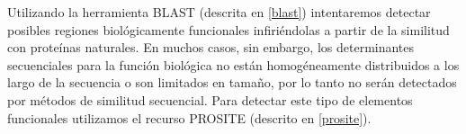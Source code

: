 Utilizando la herramienta BLAST (descrita en \ref{blast}) intentaremos detectar posibles regiones biológicamente funcionales infiriéndolas a partir de la similitud con proteínas naturales.
En muchos casos, sin embargo, los determinantes secuenciales para la función biológica no están homogéneamente distribuidos a los largo de la 
secuencia o son limitados en tamaño, por lo tanto no serán detectados por métodos de similitud secuencial.
Para detectar este tipo de elementos funcionales utilizamos el recurso PROSITE (descrito en \ref{prosite}).




